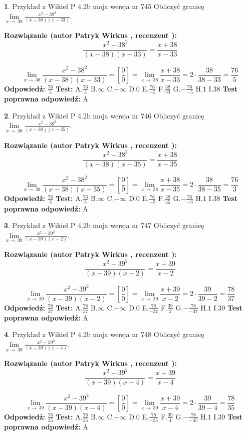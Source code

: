 \documentclass[12pt, a4paper]{article}
\theoremstyle{definition} %
\newtheorem{zad}{}
\newcommand{\zadStart}[1]{\begin{zad}#1\newline}
\newcommand{\zadStop}{\end{zad}}
\newcommand{\rozwStart}[2]{\noindent \textbf{Rozwiązanie (autor #1 , recenzent #2): }\newline}
\newcommand{\rozwStop}{\newline}
\newcommand{\odpStart}{\noindent \textbf{Odpowiedź:}\newline}
\newcommand{\odpStop}{\newline}
\newcommand{\testStart}{\noindent \textbf{Test:}\newline}
\newcommand{\testStop}{\newline}
\newcommand{\kluczStart}{\noindent \textbf{Test poprawna odpowiedź:}\newline}
\newcommand{\kluczStop}{\newline}
\begin{document}
\zadStart{Przykład z Wikieł P 4.2b moja wersja nr 745}
Obliczyć granicę $\lim\limits_{x\to\ 38}\frac{x^{2}-38^{2}}{(x-38)(x-33)}$.
\zadStop
\rozwStart{Patryk Wirkus}{}
$$\frac{x^{2}-38^{2}}{(x-38)(x-33)}=\frac{x+38}{x-33}$$

$$\lim\limits_{x\to\ 38}\frac{x^{2}-38^{2}}{(x-38)(x-33)}=[\frac{0}{0}]=\lim\limits_{x\to\ 38}\frac{x+38}{x-33}=2 \cdot \frac{38}{38-33} = \frac{76}{5}$$
\rozwStop
\odpStart
$\frac{76}{5}$
\odpStop
\testStart
A.$\frac{76}{5}$
B.$\infty$
C.$-\infty$
D.$0$
E.$\frac{76}{-5}$
F.$\frac{38}{33}$
G.$-\frac{76}{-5}$
H.$1$
I.$38$
\testStop
\kluczStart
A
\kluczStop



\zadStart{Przykład z Wikieł P 4.2b moja wersja nr 746}
Obliczyć granicę $\lim\limits_{x\to\ 38}\frac{x^{2}-38^{2}}{(x-38)(x-35)}$.
\zadStop
\rozwStart{Patryk Wirkus}{}
$$\frac{x^{2}-38^{2}}{(x-38)(x-35)}=\frac{x+38}{x-35}$$

$$\lim\limits_{x\to\ 38}\frac{x^{2}-38^{2}}{(x-38)(x-35)}=[\frac{0}{0}]=\lim\limits_{x\to\ 38}\frac{x+38}{x-35}=2 \cdot \frac{38}{38-35} = \frac{76}{3}$$
\rozwStop
\odpStart
$\frac{76}{3}$
\odpStop
\testStart
A.$\frac{76}{3}$
B.$\infty$
C.$-\infty$
D.$0$
E.$\frac{76}{-3}$
F.$\frac{38}{35}$
G.$-\frac{76}{-3}$
H.$1$
I.$38$
\testStop
\kluczStart
A
\kluczStop



\zadStart{Przykład z Wikieł P 4.2b moja wersja nr 747}
Obliczyć granicę $\lim\limits_{x\to\ 39}\frac{x^{2}-39^{2}}{(x-39)(x-2)}$.
\zadStop
\rozwStart{Patryk Wirkus}{}
$$\frac{x^{2}-39^{2}}{(x-39)(x-2)}=\frac{x+39}{x-2}$$

$$\lim\limits_{x\to\ 39}\frac{x^{2}-39^{2}}{(x-39)(x-2)}=[\frac{0}{0}]=\lim\limits_{x\to\ 39}\frac{x+39}{x-2}=2 \cdot \frac{39}{39-2} = \frac{78}{37}$$
\rozwStop
\odpStart
$\frac{78}{37}$
\odpStop
\testStart
A.$\frac{78}{37}$
B.$\infty$
C.$-\infty$
D.$0$
E.$\frac{78}{-37}$
F.$\frac{39}{2}$
G.$-\frac{78}{-37}$
H.$1$
I.$39$
\testStop
\kluczStart
A
\kluczStop



\zadStart{Przykład z Wikieł P 4.2b moja wersja nr 748}
Obliczyć granicę $\lim\limits_{x\to\ 39}\frac{x^{2}-39^{2}}{(x-39)(x-4)}$.
\zadStop
\rozwStart{Patryk Wirkus}{}
$$\frac{x^{2}-39^{2}}{(x-39)(x-4)}=\frac{x+39}{x-4}$$

$$\lim\limits_{x\to\ 39}\frac{x^{2}-39^{2}}{(x-39)(x-4)}=[\frac{0}{0}]=\lim\limits_{x\to\ 39}\frac{x+39}{x-4}=2 \cdot \frac{39}{39-4} = \frac{78}{35}$$
\rozwStop
\odpStart
$\frac{78}{35}$
\odpStop
\testStart
A.$\frac{78}{35}$
B.$\infty$
C.$-\infty$
D.$0$
E.$\frac{78}{-35}$
F.$\frac{39}{4}$
G.$-\frac{78}{-35}$
H.$1$
I.$39$
\testStop
\kluczStart
A
\kluczStop
\end{document}

